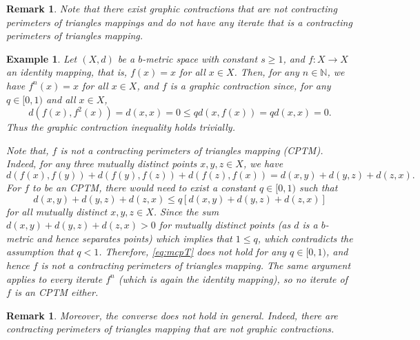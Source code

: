 \documentclass[a4paper,12pt,oneside]{article}
\newtheorem{remark}[theorem]{Remark}
\newtheorem{example}[theorem]{Example}
\numberwithin{equation}{section}
\begin{document}
\begin{remark}
Note that there exist graphic contractions that are not contracting perimeters of triangles mappings and do not have any iterate that is a contracting perimeters of triangles mapping.
\end{remark}

\begin{example}
\label{ex:identity}
Let $(X,d)$ be a $b$-metric space with constant $s\geq 1$, and $f:X\to X$ an identity mapping, that is, $f(x) = x$ for all $x\in X$. Then, for any $n\in \mathbb{N}$, we have $f^{n}(x) = x$ for all $x\in X$, and $f$ is a graphic contraction since, for any $q\in [0,1)$ and all $x\in X$,
\[
d(f(x),f^{2}(x)) = d(x,x) = 0\leq qd(x,f(x)) = qd(x,x) = 0.
\]
Thus the graphic contraction inequality holds trivially.

Note that, $f$ is not a  contracting perimeters of triangles mapping (CPTM). Indeed, for any three mutually distinct points $x,y,z\in X$, we have
\[
d(f(x),f(y)) + d(f(y),f(z)) + d(f(z),f(x)) = d(x,y) + d(y,z) + d(z,x).
\]
For $f$ to be an CPTM, there would need to exist a constant $q\in [0,1)$ such that
\[
d(x,y) + d(y,z) + d(z,x)\leq q[d(x,y) + d(y,z) + d(z,x)]
\]
for all mutually distinct $x,y,z\in X$. Since the sum $d(x,y) + d(y,z) + d(z,x) > 0$ for mutually distinct points (as $d$ is a $b$-metric and hence separates points) which implies that $1\leq q$, which contradicts the assumption that $q< 1$. Therefore, \eqref{eq:mcpT} does not hold for any $q\in [0,1)$, and hence $f$ is not a contracting perimeters of triangles mapping. The same argument applies to every iterate $f^{n}$ (which is again the identity mapping), so no iterate of $f$ is an CPTM either.
\end{example}

\begin{remark}
Moreover, the converse does not hold in general. Indeed, there are contracting perimeters of triangles mapping that are not graphic contractions.
\end{remark}
\end{document}
